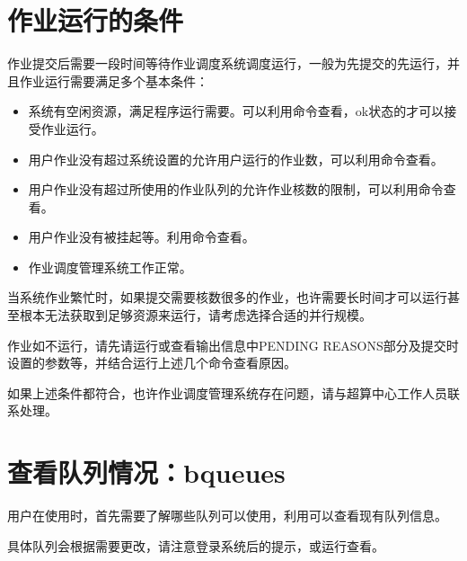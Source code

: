 \documentclass[a4paper,12pt,english]{sphinxmanual}
\begin{document}
\section{作业运行的条件}
\label{\detokenize{lsf/lsf:id1}}
\sphinxAtStartPar
作业提交后需要一段时间等待作业调度系统调度运行，一般为先提交的先运行，并且作业运行需要满足多个基本条件：
\begin{itemize}
\item {} 
\sphinxAtStartPar
系统有空闲资源，满足程序运行需要。可以利用命令查看，ok状态的才可以接受作业运行。

\item {} 
\sphinxAtStartPar
用户作业没有超过系统设置的允许用户运行的作业数，可以利用命令查看。

\item {} 
\sphinxAtStartPar
用户作业没有超过所使用的作业队列的允许作业核数的限制，可以利用命令查看。

\item {} 
\sphinxAtStartPar
用户作业没有被挂起等。利用命令查看。

\item {} 
\sphinxAtStartPar
作业调度管理系统工作正常。

\end{itemize}

\sphinxAtStartPar
当系统作业繁忙时，如果提交需要核数很多的作业，也许需要长时间才可以运行甚至根本无法获取到足够资源来运行，请考虑选择合适的并行规模。

\sphinxAtStartPar
作业如不运行，请先请运行或查看输出信息中PENDING
REASONS部分及提交时设置的参数等，并结合运行上述几个命令查看原因。

\sphinxAtStartPar
如果上述条件都符合，也许作业调度管理系统存在问题，请与超算中心工作人员联系处理。


\section{查看队列情况：bqueues}
\label{\detokenize{lsf/lsf:bqueues}}
\sphinxAtStartPar
用户在使用时，首先需要了解哪些队列可以使用，利用可以查看现有队列信息。

\sphinxAtStartPar
具体队列会根据需要更改，请注意登录系统后的提示，或运行查看。
\end{document}
